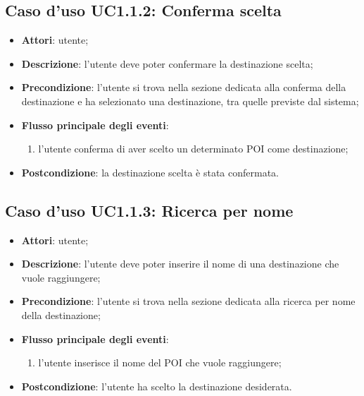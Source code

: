 \documentclass[../AnalisiDeiRequisiti.tex]{subfiles}
\begin{document}
\subsection{Caso d'uso UC1.1.2: Conferma scelta}
\begin{itemize}
\item \textbf{Attori}: utente;
\item \textbf{Descrizione}: l’utente deve poter confermare la destinazione scelta; 
      \item \textbf{Precondizione}: l'utente si trova nella sezione dedicata alla conferma della destinazione e ha selezionato una destinazione, tra quelle previste dal sistema;

        \item \textbf{Flusso principale degli eventi}:
          \begin{enumerate}
          \item l'utente conferma di aver scelto un determinato POI come destinazione;

      \end{enumerate}
    \item \textbf{Postcondizione}: la destinazione scelta è stata confermata.
  \end{itemize}
\hypertarget{UC1.1.3}{}
\subsection{Caso d'uso UC1.1.3: Ricerca per nome}
\begin{itemize}
\item \textbf{Attori}: utente;
\item \textbf{Descrizione}: l'utente deve poter inserire il nome di una destinazione che vuole raggiungere; 
      \item \textbf{Precondizione}: l'utente si trova nella sezione dedicata alla ricerca per nome della destinazione;

        \item \textbf{Flusso principale degli eventi}:
          \begin{enumerate}
          \item l'utente inserisce il nome del POI che vuole raggiungere;

      \end{enumerate}

    \item \textbf{Postcondizione}: l'utente ha scelto la destinazione desiderata.
  \end{itemize}
\hypertarget{UC1.1.4}{}
\end{document}

